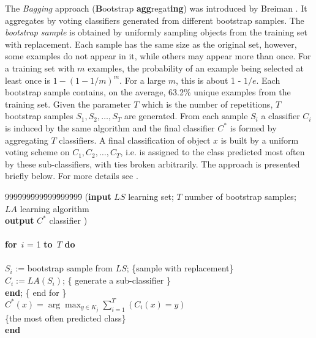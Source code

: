\documentclass{elsart}
\begin{document}
The {\em Bagging} approach ({\bf B}ootstrap {\bf agg}regat{\bf ing}) was
introduced by Breiman \cite{Bre}. It aggregates by voting classifiers
generated from different bootstrap samples. The {\it bootstrap sample} is
obtained by uniformly sampling objects from the training set with
replacement. Each sample has the same size as the original set, however,
some examples do not appear in it, while others may appear more than once.
For a training set with $m$ examples, the probability of an example being
selected at least once is $1 -(1 - 1/m)^m$. For a large $m$, this is about 1
- $1/e$.  Each bootstrap sample contains, on the average, 63.2\% unique
examples from the training set. Given the parameter $T$ which is the number
of repetitions, $T$ bootstrap samples $S_1, S_2,\ldots ,S_T$ are generated.
From each sample $S_i$ a classifier $C_i$ is induced by the same algorithm
and the final classifier $C^*$ is formed by aggregating $T$ classifiers. A
final classification of object $x$ is built by a uniform voting scheme on
$C_1,C_2,\ldots,C_T$, i.e. is assigned to the class predicted most often by
these sub-classifiers, with ties broken arbitrarily. The approach is
presented briefly below. For more details see \cite{Bre}.

\newenvironment{algo}{\newcommand{\B}{{\bf begin}}
\newcommand{\DO}{{\bf do}~} \newcommand{\E}{{\bf end}}
\newcommand{\FOR}{{\bf for}~} \newcommand{\IF}{{\bf if}~}
\newcommand{\THEN}{{\bf then}~}
\newcommand{\ELSE}{{\bf else}~}
\newcommand{\WHILE}{{\bf while}~}
\newcommand{\TO}{{\bf to}~}
\small
\begin{tabbing}
999\= 999\= 999\= 999\= 999\= 999\= \+ \+ \kill}{\end{tabbing} \normalsize}


\begin{algo}
\< \< (\textbf{input}   $LS$ learning set; $T$ number of bootstrap
samples; \\ \< \< $LA$ learning algorithm \\ \< \< \textbf{output}
$C^*$ classifier ) \\
 \< \< \B \\ \< \FOR $i$ = 1 \TO $T$ \DO\\ \<
\B
\\
  $S_i$ := bootstrap sample from $LS$; \{sample with replacement\} \\
  $C_i := LA(S_i)$; \{ generate a sub-classifier \} \\
\< \E; \{ end for \}\\ \< $C^*(x) = \arg \max_{y \in K_j} \sum
_{i=1}^{T}(C_i(x)=y)$\\
 \{the most often predicted class\}\\ \< \<
\E \\
\end{algo}
\end{document}
